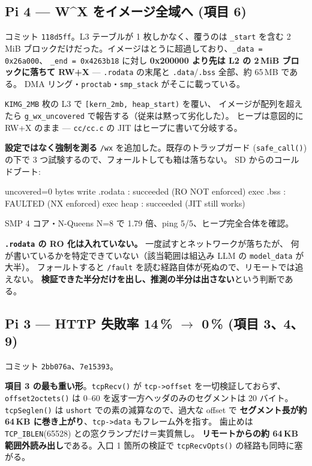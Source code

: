 \documentclass[a4paper,11pt]{ltjsarticle}
\begin{document}
\subsection{Pi 4 --- W\textasciicircum X をイメージ全域へ (項目 6)}

コミット \texttt{118d5ff}。L3 テーブルが 1 枚しかなく、覆うのは \texttt{\_start} を含む
2\,MiB ブロックだけだった。イメージはとうに超過しており、\texttt{\_data = 0x26a000}、
\texttt{\_end = 0x4263b18} に対し \textbf{0x200000 より先は L2 の 2\,MiB ブロックに落ちて
RW+X} --- \texttt{.rodata} の末尾と \texttt{.data}/\texttt{.bss} 全部、約 65\,MB である。
DMA リング・\texttt{proctab}・\texttt{smp\_stack} がそこに載っている。

\texttt{KIMG\_2MB} 枚の L3 で \texttt{[kern\_2mb, heap\_start)} を覆い、
イメージが配列を超えたら \texttt{g\_wx\_uncovered} で報告する（従来は黙って劣化した）。
ヒープは意図的に RW+X のまま --- \texttt{cc/cc.c} の JIT はヒープに書いて分岐する。

\textbf{設定ではなく強制を測る} \texttt{/wx} を追加した。既存のトラップガード
(\texttt{safe\_call()}) の下で 3 つ試験するので、フォールトしても箱は落ちない。
SD からのコールドブート:

\begin{code}
uncovered=0 bytes
write .rodata : succeeded (RO NOT enforced)
exec  .bss    : FAULTED (NX enforced)
exec  heap    : succeeded (JIT still works)
\end{code}

SMP 4 コア・N-Queens N=8 で 1.79 倍、ping 5/5、ヒープ完全合体を確認。

\textbf{\texttt{.rodata} の RO 化は入れていない。} 一度試すとネットワークが落ちたが、
何が書いているかを特定できていない（該当範囲は組込み LLM の \texttt{model\_data} が大半）。
フォールトすると \texttt{/fault} を読む経路自体が死ぬので、リモートでは追えない。
\textbf{検証できた半分だけを出し、推測の半分は出さない}という判断である。

\subsection{Pi 3 --- HTTP 失敗率 14\,\% $\rightarrow$ 0\,\% (項目 3、4、9)}

コミット \texttt{2bb076a}、\texttt{7e15393}。

\textbf{項目 3 の最も重い形}。\texttt{tcpRecv()} が \texttt{tcp->offset} を一切検証しておらず、
\texttt{offset2octets()} は 0--60 を返す一方ヘッダのみのセグメントは 20 バイト。
\texttt{tcpSeglen()} は \texttt{ushort} での素の減算なので、過大な offset で
\textbf{セグメント長が約 64\,KB に巻き上がり}、\texttt{tcp->data} もフレーム外を指す。
歯止めは \texttt{TCP\_IBLEN}(65528) との窓クランプだけ＝実質無し。
\textbf{リモートからの約 64\,KB 範囲外読み出し}である。入口 1 箇所の検証で
\texttt{tcpRecvOpts()} の経路も同時に塞がる。
\end{document}
